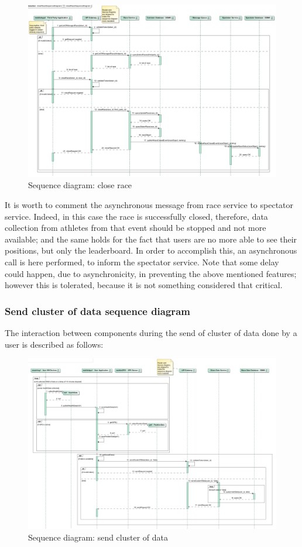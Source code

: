 \begin{figure}[H]
\includegraphics[width=\linewidth]{Images/closerace.pdf}
\caption{ Sequence diagram: close race}
\label{fig:closerace}
\end{figure}

It is worth to comment the asynchronous message from race service to spectator service. 
Indeed, in this case the race is successfully closed, therefore, data collection from athletes from that event should be stopped and not 
more available; and the same holds for the fact that users are no more able to see their positions, but only the leaderboard.
In order to accomplish this, an asynchronous call is here performed, to inform the spectator service. 
Note that some delay could happen, due to asynchronicity, in preventing the above mentioned features; however this is tolerated, because
it is not something considered that critical.

\subsubsection{Send cluster of data sequence diagram}
The interaction between components during the send of cluster of data done by a user is described as follows:

\begin{figure}[H]
\includegraphics[width=\linewidth]{Images/senddata.pdf}
\caption{ Sequence diagram: send cluster of data}
\label{fig:closerace}
\end{figure}

